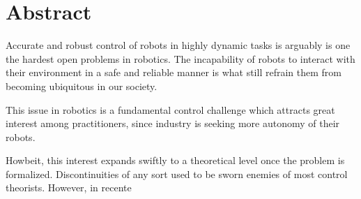 \chapter*{Abstract}
\label{abst}

Accurate and robust control of robots in highly dynamic tasks is arguably is one the hardest open problems in robotics. The incapability of robots to interact with their environment in a safe and reliable manner is what still refrain them from becoming ubiquitous in our society.
%
\newline

%
{\color{red}
This issue in robotics is a fundamental control challenge which attracts great interest among practitioners, since industry is seeking more autonomy of their robots.
}

Howbeit, this interest expands swiftly to a theoretical level once the
problem is formalized. Discontinuities of any sort used to be sworn enemies of most control theorists. However, in recente


